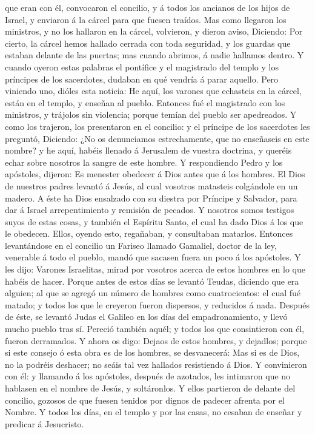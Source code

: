 que eran con él, convocaron el concilio, y á todos los ancianos de los
hijos de Israel, y enviaron á la cárcel para que fuesen traídos.
 Mas como llegaron los ministros, y no los hallaron en la
cárcel, volvieron, y dieron aviso,  Diciendo: Por cierto,
la cárcel hemos hallado cerrada con toda seguridad, y los guardas que
estaban delante de las puertas; mas cuando abrimos, á nadie hallamos
dentro.  Y cuando oyeron estas palabras el pontífice y el
magistrado del templo y los príncipes de los sacerdotes, dudaban en qué
vendría á parar aquello.  Pero viniendo uno, dióles esta
noticia: He aquí, los varones que echasteis en la cárcel, están en el
templo, y enseñan al pueblo.  Entonces fué el magistrado
con los ministros, y trájolos sin violencia; porque temían del pueblo
ser apedreados.  Y como los trajeron, los presentaron en el
concilio: y el príncipe de los sacerdotes les preguntó, 
Diciendo: ¿No os denunciamos estrechamente, que no enseñaseis en este
nombre? y he aquí, habéis llenado á Jerusalem de vuestra doctrina, y
queréis echar sobre nosotros la sangre de este hombre.  Y
respondiendo Pedro y los apóstoles, dijeron: Es menester obedecer á Dios
antes que á los hombres.  El Dios de nuestros padres
levantó á Jesús, al cual vosotros matasteis colgándole en un madero.
 A éste ha Dios ensalzado con su diestra por Príncipe y
Salvador, para dar á Israel arrepentimiento y remisión de pecados.
 Y nosotros somos testigos suyos de estas cosas, y también
el Espíritu Santo, el cual ha dado Dios á los que le obedecen.
 Ellos, oyendo esto, regañaban, y consultaban matarlos.
 Entonces levantándose en el concilio un Fariseo llamado
Gamaliel, doctor de la ley, venerable á todo el pueblo, mandó que
sacasen fuera un poco á los apóstoles.  Y les dijo: Varones
Israelitas, mirad por vosotros acerca de estos hombres en lo que habéis
de hacer.  Porque antes de estos días se levantó Teudas,
diciendo que era alguien; al que se agregó un número de hombres como
cuatrocientos: el cual fué matado; y todos los que le creyeron fueron
dispersos, y reducidos á nada.  Después de éste, se levantó
Judas el Galileo en los días del empadronamiento, y llevó mucho pueblo
tras sí. Pereció también aquél; y todos los que consintieron con él,
fueron derramados.  Y ahora os digo: Dejaos de estos
hombres, y dejadlos; porque si este consejo ó esta obra es de los
hombres, se desvanecerá:  Mas si es de Dios, no la podréis
deshacer; no seáis tal vez hallados resistiendo á Dios.  Y
convinieron con él: y llamando á los apóstoles, después de azotados, les
intimaron que no hablasen en el nombre de Jesús, y soltáronlos.
 Y ellos partieron de delante del concilio, gozosos de que
fuesen tenidos por dignos de padecer afrenta por el Nombre.
 Y todos los días, en el templo y por las casas, no cesaban
de enseñar y predicar á Jesucristo.

